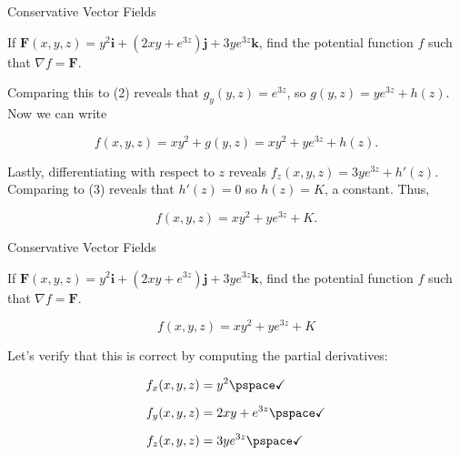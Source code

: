 \documentclass[11pt,english,
handout
]{beamer}
\begin{document}
\begin{frame}[t]{Conservative Vector Fields}
\small

\begin{example}
If $\mathbf{F}(x,y,z)=y^2\mathbf{i}+(2xy+e^{3z})\mathbf{j}+3ye^{3z}\mathbf{k}$, find the potential function $f$ such that $\nabla f=\mathbf{F}$.

\lspace
Comparing this to (2) reveals that $g_y(y,z)=e^{3z}$, so $g(y,z)=ye^{3z}+h(z)$. \pause Now we can write

\[
f(x,y,z)=xy^2+g(y,z)=xy^2+ye^{3z}+h(z).
\]\pause 

Lastly, differentiating with respect to $z$ reveals $f_z(x,y,z)=3ye^{3z}+h'(z)$. \pause Comparing to (3) reveals that $h'(z)=0$ so $h(z)=K$, a constant. \pause Thus,

\[
f(x,y,z)=xy^2+ye^{3z}+K.
\]
\end{example}
\end{frame}









\begin{frame}[t]{Conservative Vector Fields}
\small

\begin{example}
If $\mathbf{F}(x,y,z)=y^2\mathbf{i}+(2xy+e^{3z})\mathbf{j}+3ye^{3z}\mathbf{k}$, find the potential function $f$ such that $\nabla f=\mathbf{F}$.

\[
f(x,y,z)=xy^2+ye^{3z}+K
\]

\vspace{3mm}
Let's verify that this is correct by computing the partial derivatives:

\lspace
\begin{align*}
f_x(x,y,z)&=y^2\pspace\checkmark\\[2mm]
f_y(x,y,z)&=2xy+e^{3z}\pspace\checkmark\\[2mm]
f_z(x,y,z)&=3ye^{3z}\pspace\checkmark
\end{align*}
\end{example}
\end{frame}
\end{document}
